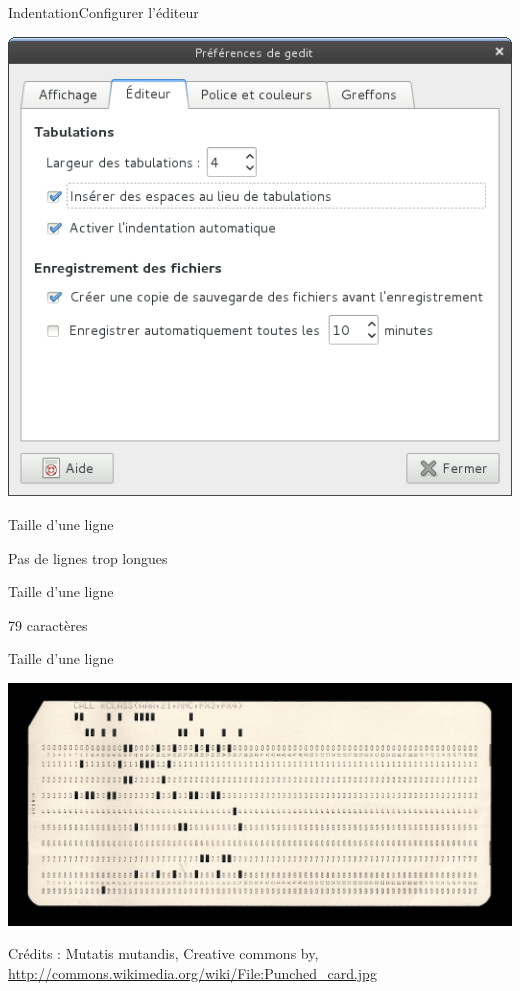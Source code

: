 \documentclass[xcolor=pdftex,dvipsnames,table,handout]{beamer}
\begin{document}
\begin{frame}{Indentation}{Configurer l'éditeur}
\begin{center}
\includegraphics[width=0.7\linewidth]{img/Capture-Preferences-de-gedit}
\end{center}
\end{frame}

\begin{frame}{Taille d'une ligne}
\begin{center}
\Huge{Pas de lignes trop longues}
\end{center}
\end{frame}

\begin{frame}{Taille d'une ligne}
\begin{center}
\Huge{79 caractères}
\end{center}
\end{frame}

\begin{frame}{Taille d'une ligne}
\begin{center}
\includegraphics[width=0.9\linewidth]{img/Punched_card}
\end{center}
\hfill \footnotesize{Crédits : Mutatis mutandis, Creative commons by, \url{http://commons.wikimedia.org/wiki/File:Punched\_card.jpg}}
\end{frame}
\end{document}
